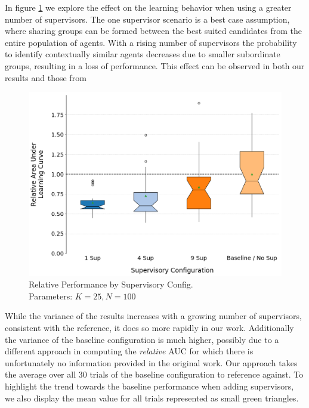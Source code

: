 \documentclass[letterpaper]{article}
\begin{document}
In figure \ref{fig:sups} we explore the effect on the learning behavior when using a greater number of supervisors. The one supervisor scenario is a best case assumption, where sharing groups can be formed between the best suited candidates from the entire population of agents. With a rising number of supervisors the probability to identify contextually similar agents decreases due to smaller subordinate groups, resulting in a loss of performance. This effect can be observed in both our results and those from \citeauthor{garant2015accelerating}
\begin{figure}[H]
 \begin{center}
  \includegraphics[width=\linewidth]{figures/figure7}
  \caption{Relative Performance by Supervisory Config.\\Parameters: $K=25,N=100$}
  \label{fig:sups}
 \end{center}
\end{figure}

While the variance of the results increases with a growing number of supervisors, consistent with the reference, it does so more rapidly in our work. Additionally the variance of the baseline configuration is much higher, possibly due to a different approach in computing the \textit{relative} AUC for which there is unfortunately no information provided in the original work. Our approach takes the average over all 30 trials of the baseline configuration to reference against. To highlight the trend towards the baseline performance when adding supervisors, we also display the mean value for all trials represented as small green triangles.
\end{document}
